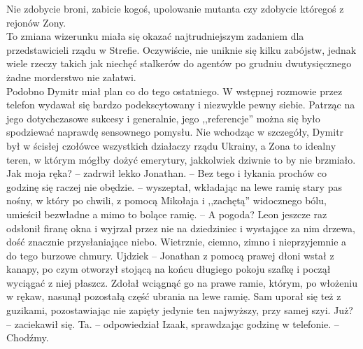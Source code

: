 \documentclass[../MAIN.tex]{subfiles}
\begin{document}
Nie zdobycie broni, zabicie kogoś, upolowanie mutanta czy zdobycie któregoś z rejonów Zony.\\
To zmiana wizerunku miała się okazać najtrudniejszym zadaniem dla przedstawicieli rządu w Strefie. Oczywiście, nie uniknie się kilku zabójstw, jednak wiele rzeczy takich jak niechęć stalkerów do agentów po grudniu dwutysięcznego żadne morderstwo nie załatwi.\\
Podobno Dymitr miał plan co do tego ostatniego. W wstępnej rozmowie przez telefon wydawał się bardzo podekscytowany i niezwykle pewny siebie. Patrząc na jego dotychczasowe sukcesy i generalnie, jego ,,referencje'' można się było spodziewać naprawdę sensownego pomysłu. Nie wchodząc w szczegóły, Dymitr był w ścisłej czołówce wszystkich działaczy rządu Ukrainy, a Zona to idealny teren, w którym mógłby dożyć emerytury, jakkolwiek dziwnie to by nie brzmiało.
\sx Jak moja ręka? -- zadrwił lekko Jonathan. -- Bez tego i łykania prochów co godzinę się raczej nie obędzie. -- wyszeptał, wkładając na lewe ramię stary pas nośny, w który po chwili, z pomocą Mikołaja i ,,zachętą'' widocznego bólu, umieścił bezwładne a mimo to bolące ramię. -- A pogoda?
\qd
Leon jeszcze raz odsłonił firanę okna i wyjrzał przez nie na dziedziniec i wystające za nim drzewa, dość znacznie przysłaniające niebo.
\sx Wietrznie, ciemno, zimno i nieprzyjemnie a do tego burzowe chmury.
\xx Ujdzie\3k -- Jonathan z pomocą prawej dłoni wstał z kanapy, po czym otworzył stojącą na końcu długiego pokoju szafkę i począł wyciągać z niej płaszcz.
\qd
Zdołał wciągnąć go na prawe ramie, którym, po włożeniu w rękaw, nasunął pozostałą część ubrania na lewe ramię. Sam uporał się też z guzikami, pozostawiając nie zapięty jedynie ten najwyższy, przy samej szyi.
\sx Już? -- zaciekawił się.
\xx Ta. -- odpowiedział Izaak, sprawdzając godzinę w telefonie. -- Chodźmy.
\qd
\end{document}
